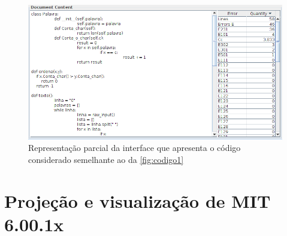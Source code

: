 		\begin{figure}[H]
			\centering
			\includegraphics[width=0.8\linewidth]{imagem/codigo2}
			\caption[Representação parcial da interface que apresenta o código considerado semelhante ao da \cref{fig:codigo1}]
			{Representação parcial da interface que apresenta o código considerado semelhante ao da \cref{fig:codigo1} \cite{Alencar-etal:2012}}
			\label{fig:codigo2}
		\end{figure}


	
	
	\section{Projeção e visualização de MIT 6.00.1x}	

